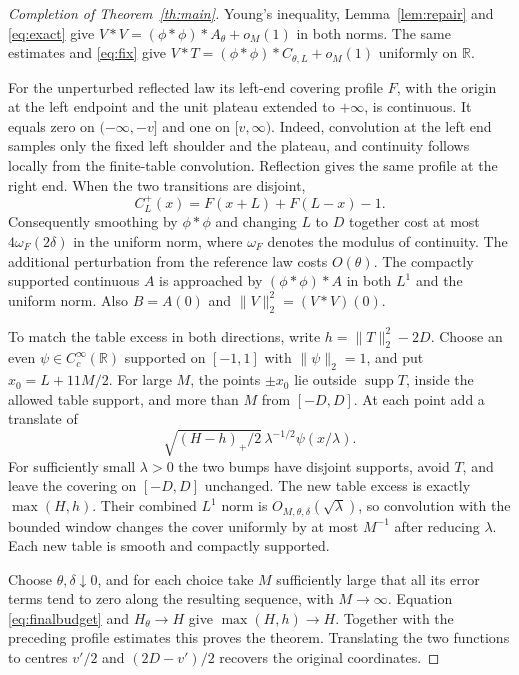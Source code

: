 \documentclass[11pt]{article}
\newcommand{\R}{\mathbb R}
\newcommand{\norm}[1]{\lVert #1\rVert}
\newcommand{\cc}{C_c^\infty(\R)}
\DeclareMathOperator{\supp}{supp}
\begin{document}
\begin{proof}[Completion of Theorem~\ref{th:main}]
Young's inequality, Lemma~\ref{lem:repair} and \eqref{eq:exact} give \(V*V=(\phi*\phi)*A_\theta+o_M(1)\) in both norms. The same estimates and \eqref{eq:fix} give \(V*T=(\phi*\phi)*C_{\theta,L}+o_M(1)\) uniformly on \(\R\).

For the unperturbed reflected law its left-end covering profile \(F\), with the origin at the left endpoint and the unit plateau extended to \(+\infty\), is continuous. It equals zero on \((-\infty,-v]\) and one on \([v,\infty)\). Indeed, convolution at the left end samples only the fixed left shoulder and the plateau, and continuity follows locally from the finite-table convolution. Reflection gives the same profile at the right end. When the two transitions are disjoint,
\[
 C_L^+(x)=F(x+L)+F(L-x)-1.
\]
Consequently smoothing by \(\phi*\phi\) and changing \(L\) to \(D\) together cost at most \(4\omega_F(2\delta)\) in the uniform norm, where \(\omega_F\) denotes the modulus of continuity. The additional perturbation from the reference law costs \(O(\theta)\). The compactly supported continuous \(A\) is approached by \((\phi*\phi)*A\) in both \(L^1\) and the uniform norm. Also \(B=A(0)\) and \(\norm V_2^2=(V*V)(0)\).

To match the table excess in both directions, write \(h=\norm T_2^2-2D\). Choose an even \(\psi\in\cc\) supported on \([-1,1]\) with \(\norm\psi_2=1\), and put \(x_0=L+11M/2\). For large \(M\), the points \(\pm x_0\) lie outside \(\supp T\), inside the allowed table support, and more than \(M\) from \([-D,D]\). At each point add a translate of
\[
 \sqrt{(H-h)_+/2}\,\lambda^{-1/2}\psi(x/\lambda).
\]
For sufficiently small \(\lambda>0\) the two bumps have disjoint supports, avoid \(T\), and leave the covering on \([-D,D]\) unchanged. The new table excess is exactly \(\max(H,h)\). Their combined \(L^1\) norm is \(O_{M,\theta,\delta}(\sqrt\lambda)\), so convolution with the bounded window changes the cover uniformly by at most \(M^{-1}\) after reducing \(\lambda\). Each new table is smooth and compactly supported.

Choose \(\theta,\delta\downarrow0\), and for each choice take \(M\) sufficiently large that all its error terms tend to zero along the resulting sequence, with \(M\to\infty\). Equation \eqref{eq:finalbudget} and \(H_\theta\to H\) give \(\max(H,h)\to H\). Together with the preceding profile estimates this proves the theorem. Translating the two functions to centres \(v'/2\) and \((2D-v')/2\) recovers the original coordinates.
\end{proof}
\end{document}
